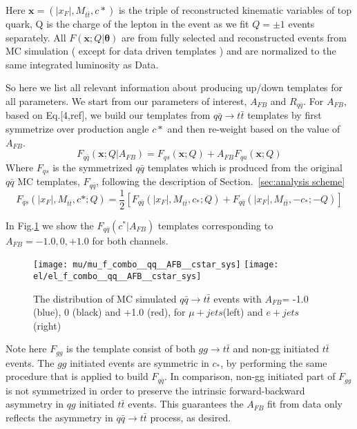 \documentclass{cmspaperpdf}
\begin{document}
Here $\bm{x}=(|x_{F}|,M_{t\bar{t}},c*)$ is the triple of reconstructed kinematic variables of top quark, Q is the charge of the lepton in the event as we fit $Q=\pm1$ events separately. All $F(\bm{x};Q|\bm{\theta})$ are from fully selected and reconstructed events from MC simulation ( except for data driven templates ) and are normalized to the same integrated luminosity as Data.

So here we list all relevant information about producing up/down templates for all parameters. We start from our parameters of interest, $A_{FB}$ and $R_{q\bar{q}}$. For $A_{FB}$, based on Eq.[4,ref], we build our templates from $q\bar{q}\rightarrow t\bar{t}$ templates by first symmetrize over production angle $c*$ and then re-weight based on the value of $A_{FB}$. 
\begin{equation}
\label{eq:Fqq_AFB}
F_{q\bar{q}}(\bm{x};Q|A_{FB}) = F_{qs}(\bm{x};Q)+ A_{FB} F_{qa}(\bm{x};Q)
\end{equation}
Where $F_{qs}$ is the symmetrized $q\bar{q}$ templates which is produced from the original $q\bar{q}$ MC templates, $F_{q\bar{q}}$, following the description of Section.~\ref{sec:analysis scheme}
\begin{equation}
F_{qs}(|x_F|,M_{t\bar{t}},c*;Q) = \frac{1}{2}\left[ F_{q\bar{q}}(|x_F|,M_{t\bar{t}},c_*;Q)+F_{q\bar{q}}(|x_F|,M_{t\bar{t}},-c_*;-Q)\right]
\end{equation}

In Fig.\ref{fig:AFB_templates} we show the $F_{q\bar{q}}(c^*|A_{FB})$ templates corresponding to $A_{FB}=-1.0,0,+1.0$ for both channels.

\begin{figure}[hbt]
  \begin{center}
    \texttt{[image: mu/mu\_f\_combo\_\_qq\_\_AFB\_\_cstar\_sys]}
    \texttt{[image: el/el\_f\_combo\_\_qq\_\_AFB\_\_cstar\_sys]}

  \caption{\small The distribution of MC simulated $q\bar{q}\rightarrow t\bar{t}$ events with $A_{FB}$= -1.0 (blue), 0 (black) and +1.0 (red), for $\mu+jets$(left) and $e+jets$(right)}
    \label{fig:AFB_templates}
  \end{center}
\end{figure}

Note here $F_{gg}$ is the template consist of both $gg\rightarrow t\bar{t}$ and non-gg initiated $t\bar{t}$ events. The $gg$ initiated events are symmetric in $c_*$, by performing the same procedure that is applied to build $F_{q\bar{q}}$. In comparison, non-gg initiated part of $F_{gg}$ is not symmetrized in order to preserve the intrinsic forward-backward asymmetry in $qg$ initiated $t\bar{t}$ events. This guarantees the $A_{FB}$ fit from data only reflects the asymmetry in $q\bar{q}\rightarrow t\bar{t}$ process, as desired. 
\end{document}

